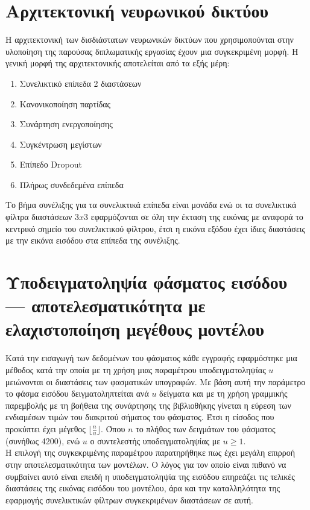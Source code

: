 \section{Αρχιτεκτονική νευρωνικού δικτύου}
Η αρχιτεκτονική των δισδιάστατων νευρωνικών δικτύων που χρησιμοπούνται στην υλοποίηση της παρούσας διπλωματικής εργασίας έχουν μια συγκεκριμένη μορφή. Η γενική μορφή της αρχιτεκτονικής αποτελείται από τα εξής μέρη:
\begin{enumerate}
    \item Συνελικτικό επίπεδα 2 διαστάσεων
    \item Κανονικοποίηση παρτίδας
    \item Συνάρτηση ενεργοποίησης
    \item Συγκέντρωση μεγίστων
    \item Επίπεδο Dropout
    \item Πλήρως συνδεδεμένα επίπεδα
\end{enumerate}
Το βήμα συνέλιξης για τα συνελικτικά επίπεδα είναι μονάδα ενώ οι τα συνελικτικά φίλτρα διαστάσεων $3x3$ εφαρμόζονται σε όλη την έκταση της εικόνας με αναφορά το κεντρικό σημείο του συνελικτικού φίλτρου, έτσι η εικόνα εξόδου έχει ίδιες διαστάσεις με την εικόνα εισόδου στα επίπεδα της συνέλιξης.

\section{Υποδειγματοληψία φάσματος εισόδου --- αποτελεσματικότητα με ελαχιστοποίηση μεγέθους μοντέλου}
Κατά την εισαγωγή των δεδομένων του φάσματος κάθε εγγραφής εφαρμόστηκε μια μέθοδος κατά την οποία με τη χρήση μιας παραμέτρου υποδειγματοληψίας  $u$ μειώνονται οι διαστάσεις των φασματικών υπογραφών. Με βάση αυτή την παράμετρο το φάσμα εισόδου δειγματοληπτείται ανά $u$ δείγματα και με τη χρήση γραμμικής παρεμβολής με τη βοήθεια της συνάρτησης  της βιβλιοθήκης  γίνεται η εύρεση των ενδιαμέσων τιμών του διακριτού σήματος του φάσματος. Έτσι η είσοδος που προκύπτει έχει μέγεθος $\lfloor\frac{n}{u}\rfloor$. Όπου $n$ το πλήθος των δειγμάτων του φάσματος (συνήθως 4200), ενώ $u$ ο συντελεστής υποδειγματοληψίας με $u\ge1$.\\
Η επιλογή της συγκεκριμένης παραμέτρου παρατηρήθηκε πως έχει μεγάλη επιρροή στην αποτελεσματικότητα των μοντέλων. Ο λόγος για τον οποίο είναι πιθανό να συμβαίνει αυτό είναι επειδή η υποδειγματοληψία της εισόδου επηρεάζει τις τελικές διαστάσεις της εικόνας εισόδου του μοντέλου, άρα και την καταλληλότητα της εφαρμογής συνελικτικών φίλτρων συγκεκριμένων διαστάσεων σε αυτή.

